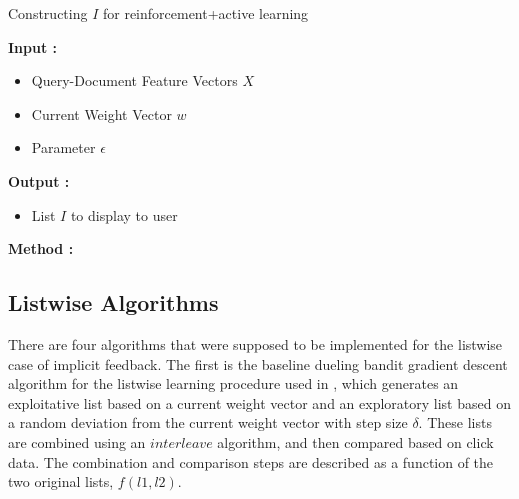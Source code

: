 \documentclass{acm_proc_article-sp}
\begin{document}
\begin{algorithm}[t]
\caption{Constructing $I$ for reinforcement+active learning}
\begin{spacing}{0.9}
\begin{algorithmic}
\STATE \textbf{Input :} \begin{itemize}
\item Query-Document Feature Vectors $X$
\item Current Weight Vector $w$
\item Parameter $\epsilon$
 \end{itemize}
\STATE \textbf{Output :} \begin{itemize}
\item List $I$ to display to user
 \end{itemize}
\STATE \textbf{Method :}
\begin{enumerate}
\ENDWHILE
{}
\end{enumerate}
\end{algorithmic}
\end{spacing}
\label{reinforceActive}
\end{algorithm}


\subsection{Listwise Algorithms}
There are four algorithms that were supposed to be implemented for the listwise case of implicit feedback. The first is the baseline dueling bandit gradient descent algorithm for the listwise learning procedure used in \cite{hofmann}, which generates an exploitative list based on a current weight vector and an exploratory list based on a random deviation from the current weight vector with step size $\delta$.  These lists are combined using an $interleave$ algorithm, and then compared based on click data.  The combination and comparison steps are described as a function of the two original lists, $f(l1,l2)$. \\ 
\end{document}
